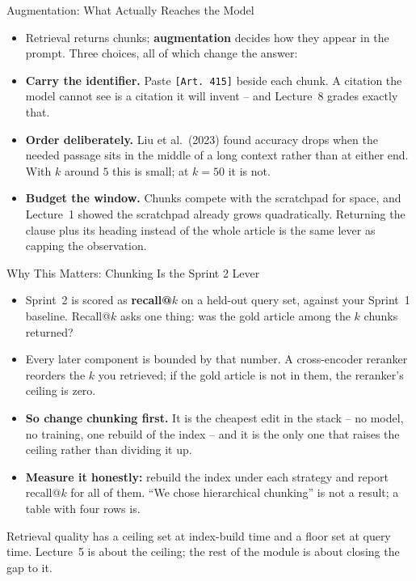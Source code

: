 \begin{frame}{Augmentation: What Actually Reaches the Model}
\begin{itemize}
  \item Retrieval returns chunks; \textbf{augmentation} decides how they appear in the prompt. Three choices, all of which change the answer:
  \pause
  \item \textbf{Carry the identifier.} Paste \texttt{[Art.~415]} beside each chunk. A citation the model cannot see is a citation it will invent -- and Lecture~8 grades exactly that.
  \pause
  \item \textbf{Order deliberately.} Liu et al.\ (2023) found accuracy drops when the needed passage sits in the middle of a long context rather than at either end. With $k$ around $5$ this is small; at $k = 50$ it is not.
  \pause
  \item \textbf{Budget the window.} Chunks compete with the scratchpad for space, and Lecture~1 showed the scratchpad already grows quadratically. Returning the clause plus its heading instead of the whole article is the same lever as capping the observation.
\end{itemize}
\end{frame}

\begin{frame}{Why This Matters: Chunking Is the Sprint 2 Lever}
\begin{itemize}
  \item Sprint~2 is scored as \textbf{recall@$k$} on a held-out query set, against your Sprint~1 baseline. Recall@$k$ asks one thing: was the gold article among the $k$ chunks returned?
  \pause
  \item Every later component is bounded by that number. A cross-encoder reranker reorders the $k$ you retrieved; if the gold article is not in them, the reranker's ceiling is zero.
  \pause
  \item \textbf{So change chunking first.} It is the cheapest edit in the stack -- no model, no training, one rebuild of the index -- and it is the only one that raises the ceiling rather than dividing it up.
  \pause
  \item \textbf{Measure it honestly:} rebuild the index under each strategy and report recall@$k$ for all of them. ``We chose hierarchical chunking'' is not a result; a table with four rows is.
\end{itemize}
\pause
\begin{rlintuition}
Retrieval quality has a ceiling set at index-build time and a floor set at query time. Lecture~5 is about the ceiling; the rest of the module is about closing the gap to it.
\end{rlintuition}
\end{frame}
